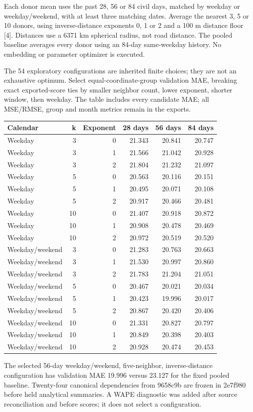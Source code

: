 \documentclass[11pt]{article}
\begin{document}
Each donor mean uses the past 28, 56 or 84 civil days, matched by weekday or weekday/weekend, with at least three matching dates. Average the nearest 3, 5 or 10 donors, using inverse-distance exponents 0, 1 or 2 and a 100 m distance floor [4]. Distances use a 6371 km spherical radius, not road distance. The pooled baseline averages every donor using an 84-day same-weekday history. No embedding or parameter optimizer is executed.

The 54 exploratory configurations are inherited finite choices; they are not an exhaustive optimum. Select equal-coordinate-group validation MAE, breaking exact exported-score ties by smaller neighbor count, lower exponent, shorter window, then weekday. The table includes every candidate MAE; all MSE/RMSE, group and month metrics remain in the exports.

\begin{center}\small\setlength{\tabcolsep}{4pt}
\begin{tabular}{lrrrrr}\toprule
Calendar & k & Exponent & 28 days & 56 days & 84 days \\
\midrule
Weekday & 3 & 0 & 21.343 & 20.841 & 20.747 \\
Weekday & 3 & 1 & 21.566 & 21.042 & 20.928 \\
Weekday & 3 & 2 & 21.804 & 21.232 & 21.097 \\
Weekday & 5 & 0 & 20.563 & 20.116 & 20.151 \\
Weekday & 5 & 1 & 20.495 & 20.071 & 20.108 \\
Weekday & 5 & 2 & 20.917 & 20.466 & 20.481 \\
Weekday & 10 & 0 & 21.407 & 20.918 & 20.872 \\
Weekday & 10 & 1 & 20.908 & 20.478 & 20.469 \\
Weekday & 10 & 2 & 20.972 & 20.519 & 20.520 \\
Weekday/weekend & 3 & 0 & 21.283 & 20.763 & 20.663 \\
Weekday/weekend & 3 & 1 & 21.530 & 20.997 & 20.860 \\
Weekday/weekend & 3 & 2 & 21.783 & 21.204 & 21.051 \\
Weekday/weekend & 5 & 0 & 20.467 & 20.021 & 20.034 \\
Weekday/weekend & 5 & 1 & 20.423 & 19.996 & 20.017 \\
Weekday/weekend & 5 & 2 & 20.867 & 20.420 & 20.406 \\
Weekday/weekend & 10 & 0 & 21.331 & 20.827 & 20.797 \\
Weekday/weekend & 10 & 1 & 20.849 & 20.398 & 20.403 \\
Weekday/weekend & 10 & 2 & 20.928 & 20.474 & 20.453 \\
\bottomrule\end{tabular}\end{center}
The selected 56-day weekday/weekend, five-neighbor, inverse-distance configuration has validation MAE 19.996 versus 23.127 for the fixed pooled baseline. Twenty-four canonical dependencies from 9658c9b are frozen in 2e7f980 before held analytical summaries. A WAPE diagnostic was added after source reconciliation and before scores; it does not select a configuration.
\end{document}
